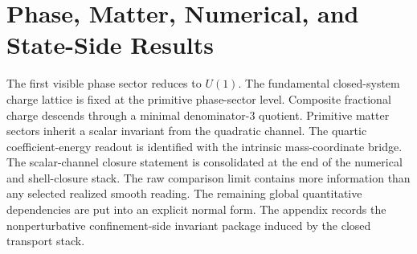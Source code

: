 \section*{Phase, Matter, Numerical, and State-Side Results}
\begin{description}[leftmargin=4.8cm,style=nextline,itemsep=0.25em,before=\raggedright]
{The first visible phase sector reduces to \(U(1)\).}
{The fundamental closed-system charge lattice is fixed at the primitive
phase-sector level.}
{Composite fractional charge descends through a minimal denominator-\(3\)
quotient.}
{Primitive matter sectors inherit a scalar invariant from the quadratic
channel.}
{The quartic coefficient-energy readout is identified with the intrinsic
mass-coordinate bridge.}
{The scalar-channel closure statement is consolidated at the end of the
numerical and shell-closure stack.}
{The raw comparison limit contains more information than any selected
realized smooth reading.}
{The remaining global quantitative dependencies are put into an explicit
normal form.}
{The appendix records the nonperturbative confinement-side invariant
package induced by the closed transport stack.}
\end{description}

\let\resultloc\relax
\let\resultitem\relax
